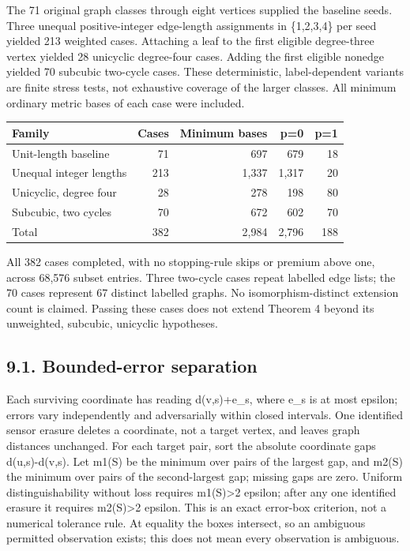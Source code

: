 \documentclass[
]{article}
\newcounter{none} %
\begin{document}
The 71 original graph classes through eight vertices supplied the
baseline seeds. Three unequal positive-integer edge-length assignments
in \{1,2,3,4\} per seed yielded 213 weighted cases. Attaching a leaf to
the first eligible degree-three vertex yielded 28 unicyclic degree-four
cases. Adding the first eligible nonedge yielded 70 subcubic two-cycle
cases. These deterministic, label-dependent variants are finite stress
tests, not exhaustive coverage of the larger classes. All minimum
ordinary metric bases of each case were included.

{\def\LTcaptype{none} %
\begin{longtable}[]{@{}lrrrr@{}}
\toprule\noalign{}
Family & Cases & Minimum bases & p=0 & p=1 \\
\midrule\noalign{}
\endhead
\bottomrule\noalign{}
\endlastfoot
Unit-length baseline & 71 & 697 & 679 & 18 \\
Unequal integer lengths & 213 & 1,337 & 1,317 & 20 \\
Unicyclic, degree four & 28 & 278 & 198 & 80 \\
Subcubic, two cycles & 70 & 672 & 602 & 70 \\
Total & 382 & 2,984 & 2,796 & 188 \\
\end{longtable}
}

All 382 cases completed, with no stopping-rule skips or premium above
one, across 68,576 subset entries. Three two-cycle cases repeat labelled
edge lists; the 70 cases represent 67 distinct labelled graphs. No
isomorphism-distinct extension count is claimed. Passing these cases
does not extend Theorem 4 beyond its unweighted, subcubic, unicyclic
hypotheses.

\subsection{9.1. Bounded-error
separation}\label{bounded-error-separation}

Each surviving coordinate has reading d(v,s)+e\_s, where
\textbar e\_s\textbar{} is at most epsilon; errors vary independently
and adversarially within closed intervals. One identified sensor erasure
deletes a coordinate, not a target vertex, and leaves graph distances
unchanged. For each target pair, sort the absolute coordinate gaps
\textbar d(u,s)-d(v,s)\textbar. Let m1(S) be the minimum over pairs of
the largest gap, and m2(S) the minimum over pairs of the second-largest
gap; missing gaps are zero. Uniform distinguishability without loss
requires m1(S)\textgreater2 epsilon; after any one identified erasure it
requires m2(S)\textgreater2 epsilon. This is an exact error-box
criterion, not a numerical tolerance rule. At equality the boxes
intersect, so an ambiguous permitted observation exists; this does not
mean every observation is ambiguous.
\end{document}

